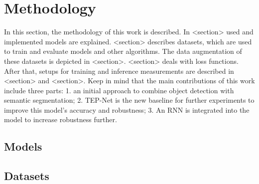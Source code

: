 \chapter{Methodology}
\label{sec:methodology}


In this section, the methodology of this work is described.
In <section> used and implemented models are explained.
<section> describes datasets, which are used to train and evaluate models and other algorithms.
The data augmentation of these datasets is depicted in <section>.
<section> deals with loss functions. After that, setups for training and inference measurements are described in <section> and <section>.
Keep in mind that the main contributions of this work include three parts:
1. an initial approach to combine object detection with semantic segmentation;
2. TEP-Net \cite{tepNet2024} is the new baseline for further experiments to improve this model's accuracy and robustness;
3. An RNN is integrated into the model to increase robustness further.


\section{Models}
%

%


\section{Datasets}















